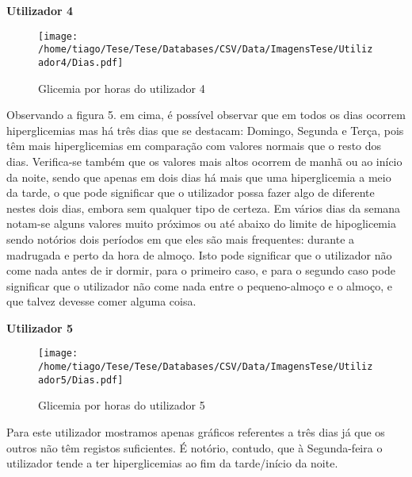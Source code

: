 \textbf{Utilizador 4}

\begin{figure}[H]
\centering
\texttt{[image: /home/tiago/Tese/Tese/Databases/CSV/Data/ImagensTese/Utilizador4/Dias.pdf]}
\caption{Glicemia por horas do utilizador 4}
\end{figure}Observando a figura 5. em cima, é possível observar que em todos os dias ocorrem hiperglicemias mas há três dias que se destacam: Domingo, Segunda e Terça, pois têm mais hiperglicemias em comparação com valores normais que o resto dos dias. Verifica-se também que os valores mais altos ocorrem de manhã ou ao início da noite, sendo que apenas em dois dias há mais que uma hiperglicemia a meio da tarde, o que pode significar que o utilizador possa fazer algo de diferente nestes dois dias, embora sem qualquer tipo de certeza. 
Em vários dias da semana notam-se alguns valores muito próximos ou até abaixo do limite de hipoglicemia sendo notórios dois períodos em que eles são mais frequentes: durante a madrugada e perto da hora de almoço. Isto pode significar que o utilizador não come nada antes de ir dormir, para o primeiro caso, e para o segundo caso pode significar que o utilizador não come nada entre o pequeno-almoço e o almoço, e que talvez devesse comer alguma coisa. 


\textbf{Utilizador 5}

\begin{figure}[H]
\centering
\texttt{[image: /home/tiago/Tese/Tese/Databases/CSV/Data/ImagensTese/Utilizador5/Dias.pdf]}
\caption{Glicemia por horas do utilizador 5}
\end{figure}
Para este utilizador mostramos apenas gráficos referentes a três dias já que os outros não têm registos suficientes. É notório, contudo, que à Segunda-feira o utilizador tende a ter hiperglicemias ao fim da tarde/início da noite. 



